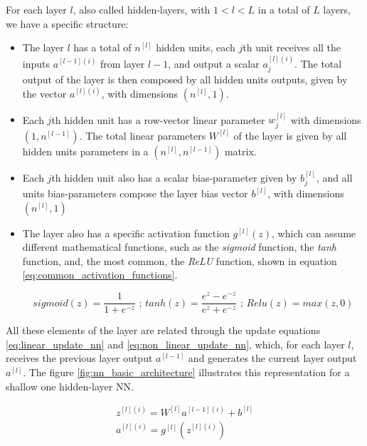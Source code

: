 For each layer $l$, also called hidden-layers, with $1<l<L$ in a total of $L$ layers, we have a specific structure:
\begin{itemize}

\item
	The layer $l$ has a total of $n^{[l]}$ hidden units, each $j$th unit receives all the inputs $a^{[l-1](i)}$ from layer $l-1$, and output a scalar $a^{[l](i)}_j$. The total output of the layer is then composed by all hidden units outputs, given by the vector $a^{[l](i)}$, with dimensions $(n^{[l]},1)$.
	
\item
	Each $j$th hidden unit has a row-vector linear parameter $w^{[l]}_j$ with dimensions $(1,n^{[l-1]})$. The total linear parameters $W^{[l]}$ of the layer is given by all hidden units parameters in a $(n^{[l]},n^{[l-1]})$ matrix.
	
\item
	Each $j$th hidden unit also has a scalar bias-parameter given by $b^{[l]}_j$, and all units bias-parameters compose the layer bias vector $b^{[l]}$, with dimensions $(n^{[l]},1)$
	
\item
	The layer also has a specific activation function $g^{[l]}(z)$, which can assume different mathematical functions, such as the \textit{sigmoid} function, the \textit{tanh} function, and, the most common, the \textit{ReLU} function, shown in equation \ref{eq:common_activation_functions}.

\begin{equation}
sigmoid(z) = \frac{1}{1+e^{-z}} \text{ ; } tanh(z) = \frac{e^z - e^{-z}}{e^z + e^{-z}} \text{ ; } Relu(z) = max(z,0)
\label{eq:common_activation_functions}
\end{equation}

\end{itemize}

All these elements of the layer are related through the update equations \ref{eq:linear_update_nn} and \ref{eq:non_linear_update_nn}, which, for each layer $l$, receives the previous layer output $a^{[l-1]}$ and generates the current layer output $a^{[l]}$. The figure \ref{fig:nn_basic_architecture} illustrates this representation for a shallow one hidden-layer NN.

\begin{align}
z^{[l](i)} = W^{[l]}a^{[l-1](i)} + b^{[l]}
\label{eq:linear_update_nn}
\\
a^{[l](i)} = g^{[l]}(z^{[l](i)})
\label{eq:non_linear_update_nn}
\end{align}

